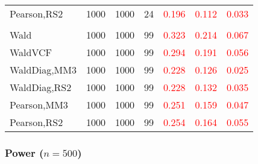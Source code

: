 \documentclass[
]{article}
\begin{document}
\begin{table}[H]
{\begin{tabular}[t]{lrrrrrr}
\hspace{1em}Pearson,RS2 & 1000 & 1000 & 24 & \textcolor{red}{0.196} & \textcolor{red}{0.112} & \textcolor{red}{0.033}\\
\addlinespace[0.3em]
\multicolumn{7}{l}{\textbf{3F 15V}}\\
\hspace{1em}Wald & 1000 & 1000 & 99 & \textcolor{red}{0.323} & \textcolor{red}{0.214} & \textcolor{red}{0.067}\\
\hspace{1em}WaldVCF & 1000 & 1000 & 99 & \textcolor{red}{0.294} & \textcolor{red}{0.191} & \textcolor{red}{0.056}\\
\hspace{1em}WaldDiag,MM3 & 1000 & 1000 & 99 & \textcolor{red}{0.228} & \textcolor{red}{0.126} & \textcolor{red}{0.025}\\
\hspace{1em}WaldDiag,RS2 & 1000 & 1000 & 99 & \textcolor{red}{0.228} & \textcolor{red}{0.132} & \textcolor{red}{0.035}\\
\hspace{1em}Pearson,MM3 & 1000 & 1000 & 99 & \textcolor{red}{0.251} & \textcolor{red}{0.159} & \textcolor{red}{0.047}\\
\hspace{1em}Pearson,RS2 & 1000 & 1000 & 99 & \textcolor{red}{0.254} & \textcolor{red}{0.164} & \textcolor{red}{0.055}\\
\bottomrule
\end{tabular}}
\endgroup{}
\end{table}

\hypertarget{power-n500-1}{%
\subsubsection{\texorpdfstring{Power
(\(n=500\))}{Power (n=500)}}\label{power-n500-1}}
\end{document}
